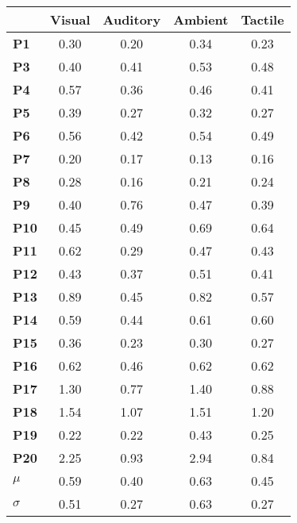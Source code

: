 \begin{normalsize}\begin{tabular}{|l|c|c|c|c|}
\hline
&\textbf{Visual}&\textbf{Auditory}&\textbf{Ambient}&\textbf{Tactile}\\\hline
\textbf{P1}&0.30&0.20&0.34&0.23\\\hline
\textbf{P3}&0.40&0.41&0.53&0.48\\\hline
\textbf{P4}&0.57&0.36&0.46&0.41\\\hline
\textbf{P5}&0.39&0.27&0.32&0.27\\\hline
\textbf{P6}&0.56&0.42&0.54&0.49\\\hline
\textbf{P7}&0.20&0.17&0.13&0.16\\\hline
\textbf{P8}&0.28&0.16&0.21&0.24\\\hline
\textbf{P9}&0.40&0.76&0.47&0.39\\\hline
\textbf{P10}&0.45&0.49&0.69&0.64\\\hline
\textbf{P11}&0.62&0.29&0.47&0.43\\\hline
\textbf{P12}&0.43&0.37&0.51&0.41\\\hline
\textbf{P13}&0.89&0.45&0.82&0.57\\\hline
\textbf{P14}&0.59&0.44&0.61&0.60\\\hline
\textbf{P15}&0.36&0.23&0.30&0.27\\\hline
\textbf{P16}&0.62&0.46&0.62&0.62\\\hline
\textbf{P17}&1.30&0.77&1.40&0.88\\\hline
\textbf{P18}&1.54&1.07&1.51&1.20\\\hline
\textbf{P19}&0.22&0.22&0.43&0.25\\\hline
\textbf{P20}&2.25&0.93&2.94&0.84\\\hline
\textbf{$\mu$}&0.59&0.40&0.63&0.45\\\hline
\textbf{$\sigma$}&0.51&0.27&0.63&0.27\\\hline
\end{tabular}
\end{normalsize}